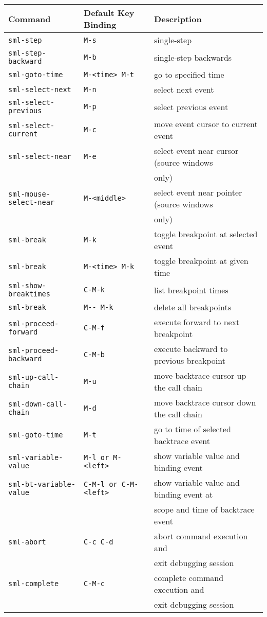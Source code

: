 \begin{center}
\begin{tabular}{|lll|}    \hline
Command & Default Key Binding & Description \\ \hline
\verb'sml-step' & \verb'M-s'             & single-step \\
\verb'sml-step-backward' & \verb'M-b'           & single-step backwards \\
\verb'sml-goto-time' & \verb'M-<time> M-t'    & go to specified time \\
\verb'sml-select-next' & \verb'M-n'             & select next event \\
\verb'sml-select-previous' & \verb'M-p'             & select previous event \\
\verb'sml-select-current' & \verb'M-c'  & move event cursor to current event \\
\verb'sml-select-near' & \verb'M-e' &
	select event near cursor (source windows \\
    & & only) \\
\verb'sml-mouse-select-near' & \verb'M-<middle>' &
	select event near pointer (source windows \\
    & & only) \\
\verb'sml-break' & \verb'M-k' & toggle breakpoint at selected event \\
\verb'sml-break' & \verb'M-<time> M-k' & toggle breakpoint at given time \\
\verb'sml-show-breaktimes' & \verb'C-M-k'           & list breakpoint times \\
\verb'sml-break' & \verb'M-- M-k'         & delete all breakpoints \\
\verb'sml-proceed-forward' & \verb'C-M-f' 
	& execute forward to next breakpoint \\
\verb'sml-proceed-backward' & \verb'C-M-b' &
	execute backward to previous breakpoint \\
\verb'sml-up-call-chain' & \verb'M-u' &
	move backtrace cursor up the call chain \\
\verb'sml-down-call-chain' & \verb'M-d' &
	move backtrace cursor down the call chain \\
\verb'sml-goto-time' & \verb'M-t' & go to time of selected backtrace event \\
\verb'sml-variable-value' & \verb'M-l or M-<left>' &
	show variable value and binding event \\
\verb'sml-bt-variable-value' & \verb'C-M-l or C-M-<left>' &
	show variable value and binding event at \\ 
                         & & scope and time of backtrace event \\
\verb'sml-abort' & \verb'C-c C-d' &
	abort command execution and \\
    & & exit debugging session \\
\verb'sml-complete' & \verb'C-M-c' & 
	complete command execution and \\
    & & exit debugging session \\
\hline
\end{tabular}
\end{center}

